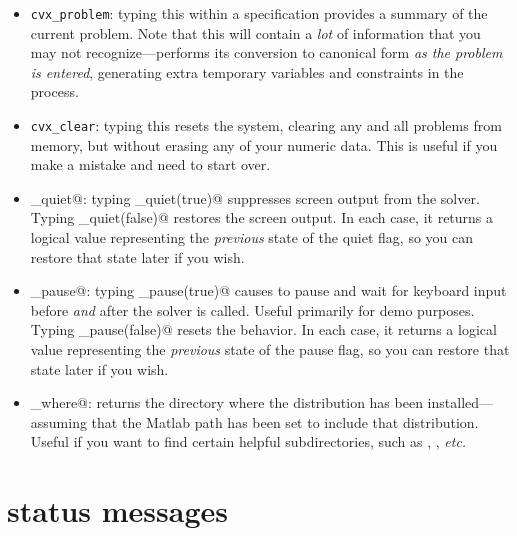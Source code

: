 \documentclass[12pt]{article}
\begin{document}
\begin{itemize}
\item \verb+cvx_problem+: typing this within a \cvx specification provides a summary
of the current problem. Note that this will contain a \emph{lot} of information
that you may not recognize---\cvx performs its conversion to canonical form
\emph{as the problem is entered}, generating extra temporary variables and
constraints in the process.
\item \verb+cvx_clear+: typing this resets the \cvx system, clearing any and all problems
from memory, but without erasing any of your numeric data.
This is useful if you make a mistake and need to start over.
\item \verb@cvx_quiet@: typing \verb@cvx_quiet(true)@ suppresses screen
output from the solver. Typing \verb@cvx_quiet(false)@ restores the screen
output. In each case, it returns a logical value representing the \emph{previous}
state of the quiet flag, so you can restore that state later if you wish.
\item \verb@cvx_pause@: typing \verb@cvx_pause(true)@ causes \cvx to pause and
wait for keyboard input before \emph{and} after the solver is called. Useful
primarily for demo purposes. Typing \verb@cvx_pause(false)@ resets the behavior.
In each case, it returns a logical value representing the \emph{previous} state
of the pause flag, so you can restore that state later if you wish.
\item \verb@cvx_where@: returns the directory where the \cvx distribution
has been installed---assuming that the Matlab path has been set to include
that distribution. Useful if you want to find certain helpful subdirectories,
such as \verb@doc@, \verb@examples@, \emph{etc.}
\end{itemize}

\section{\cvx status messages}
\label{sec:status}
\end{document}
